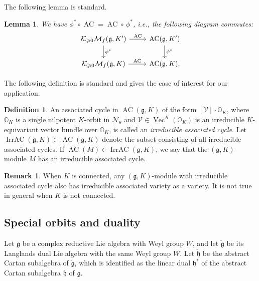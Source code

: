\documentclass[11pt, a4paper]{amsart}
\makeatletter
\let\origsection\section
\renewcommand\section{\@ifstar{\starsection}{\nostarsection}}
\newcommand\nostarsection[1]
{\sectionprelude\origsection{#1}\sectionpostlude}
\newcommand\starsection[1]
{\sectionprelude\origsection*{#1}\sectionpostlude}
\newcommand\sectionprelude{%
  \vspace{1em}
}
\newcommand\sectionpostlude{%
  \vspace{1em}
}
\newcommand{\g}{\mathfrak{g}}
\newcommand{\orb}{\mathbb{O}}
\newcommand{\orbk}{\orb_{K}}
\newcommand{\fg}{\mathfrak{g}}
\newcommand{\fh}{\mathfrak{h}}
\newcommand{\ckfg}{{\check{\fg}}}
\newcommand{\ckfh}{{\check{\fh}}}
\newcommand{\cK}{\mathcal{K}}
\newcommand{\cM}{\mathcal{M}}
\newcommand{\cN}{\mathcal{N}}
\newcommand{\cV}{\mathcal{V}}
\newcommand{\MgK}{\cM_f(\g,K)}
\DeclareMathOperator{\AC}{AC}
\DeclareMathOperator{\Vect}{Vec}
\DeclareMathOperator{\IrrAC}{IrrAC}
\newtheorem{Lem}[Thm]{Lemma}
\theoremstyle{definition}
\newtheorem{defi}[Thm]{Definition}
\newtheorem{Rem}[Thm]{Remark}
\numberwithin{equation}{section}
\makeatother
\begin{document}
The following lemma is standard.

\begin{Lem} \label{lem:AC_pullback}
	We have $\phi^* \circ \AC = \AC \circ \,\phi^*$, i.e., the following diagram commutes:
	\[
		\begin{tikzcd}
			\cK_{\geqslant 0}\cM_f(\g,K') \arrow[r, "\AC"] \arrow[d, "\phi^*"] & \AC(\g,K') \arrow[d, "\phi^*"] \\
			\cK_{\geqslant 0}\MgK \arrow[r, "\AC"] & \AC(\g,K).
		\end{tikzcd}
	\]
\end{Lem} 

The following definition is standard and gives the case of interest for our application.

\begin{defi} \label{defn:irred_AC}
	An associated cycle in $\AC(\g,K)$ of the form $[\cV] \cdot \orbk$, where $\orbk$ is a single nilpotent $K$-orbit in $\cN_\theta$ and $\cV \in \Vect^K(\orbk)$ is an irreducible $K$-equivariant vector bundle over $\orbk$, is called an \emph{irreducible associated cycle}. Let $\IrrAC(\g,K) \subset \AC(\g,K)$ denote the subset consisting of all irreducible associated cycles. 
	If $\AC(M) \in \IrrAC(\g,K)$, we say that the $(\g,K)$-module $M$ has an irreducible associated cycle.
\end{defi}

\begin{Rem}
	When $K$ is connected, any $(\g,K)$-module with irreducible associated cycle also has irreducible associated variety as a variety. It is not true in general when $K$ is not connected.
\end{Rem}


\section{Geometry of special pieces}
\label{sec:geometry_special_pieces}

\subsection{Special orbits and duality} \label{subsec:special_duality}

Let $\g$ be a complex reductive Lie algebra with Weyl group $W$, and let $\ckfg$ be its Langlands dual Lie algebra with the same Weyl group $W$. Let $\ckfh$ be the abstract Cartan subalgebra of $\ckfg$, which is identified as the linear dual $\fh^*$ of the abstract Cartan subalgebra $\fh$ of $\g$. 
\end{document}
